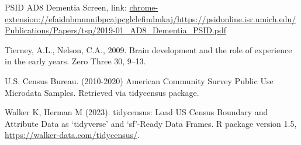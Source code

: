 \documentclass[
]{article}
\begin{document}
PSID AD8 Dementia Screen, link:
\url{chrome-extension://efaidnbmnnnibpcajpcglclefindmkaj/https://psidonline.isr.umich.edu/Publications/Papers/tsp/2019-01_AD8_Dementia_PSID.pdf}

Tierney, A.L., Nelson, C.A., 2009. Brain development and the role of
experience in the early years. Zero Three 30, 9--13.

U.S. Census Bureau. (2010-2020) American Community Survey Public Use
Microdata Samples. Retrieved via tidycensus package.

Walker K, Herman M (2023). tidycensus: Load US Census Boundary and
Attribute Data as `tidyverse' and `sf'-Ready Data Frames. R package
version 1.5, \url{https://walker-data.com/tidycensus/}.
\end{document}
